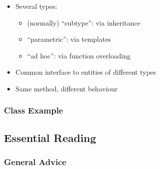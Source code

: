 \begin{itemize}
\itemsep1pt\parskip0pt
\item
  Several types:

  \begin{itemize}
  \itemsep1pt\parskip0pt
  \item
    (normally) ``subtype'': via inheritance
  \item
    ``parametric'': via templates
  \item
    ``ad hoc'': via function overloading
  \end{itemize}
\item
  Common interface to entities of different types
\item
  Same method, different behaviour
\end{itemize}

\subsubsection{Class Example}\label{class-example-3}

\begin{Shaded}
\begin{Highlighting}[]
  
\NormalTok{\{}

   \NormalTok{;}

  \NormalTok{);}
  \NormalTok{);}
\NormalTok{\}}
\end{Highlighting}
\end{Shaded}

\subsection{Essential Reading}\label{essential-reading}

\subsubsection{General Advice}\label{general-advice}

